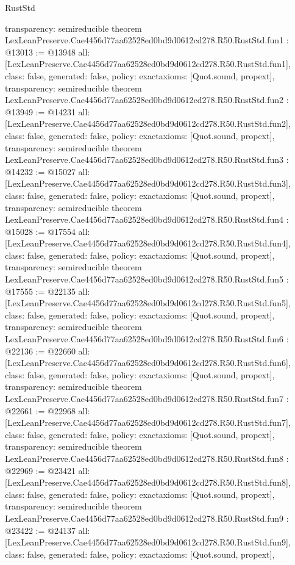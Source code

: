 \begin{lexlean}{RustStd}
\begin{coremodule}
{  transparency: semireducible
}
theorem LexLeanPreserve.Cae4456d77aa62528ed0bd9d0612cd278.R50.RustStd.fun1 : @13013 := @13948 {
  all: [LexLeanPreserve.Cae4456d77aa62528ed0bd9d0612cd278.R50.RustStd.fun1],
  class: false,
  generated: false,
  policy: exact{axioms: [Quot.sound, propext]},
  transparency: semireducible
}
theorem LexLeanPreserve.Cae4456d77aa62528ed0bd9d0612cd278.R50.RustStd.fun2 : @13949 := @14231 {
  all: [LexLeanPreserve.Cae4456d77aa62528ed0bd9d0612cd278.R50.RustStd.fun2],
  class: false,
  generated: false,
  policy: exact{axioms: [Quot.sound, propext]},
  transparency: semireducible
}
theorem LexLeanPreserve.Cae4456d77aa62528ed0bd9d0612cd278.R50.RustStd.fun3 : @14232 := @15027 {
  all: [LexLeanPreserve.Cae4456d77aa62528ed0bd9d0612cd278.R50.RustStd.fun3],
  class: false,
  generated: false,
  policy: exact{axioms: [Quot.sound, propext]},
  transparency: semireducible
}
theorem LexLeanPreserve.Cae4456d77aa62528ed0bd9d0612cd278.R50.RustStd.fun4 : @15028 := @17554 {
  all: [LexLeanPreserve.Cae4456d77aa62528ed0bd9d0612cd278.R50.RustStd.fun4],
  class: false,
  generated: false,
  policy: exact{axioms: [Quot.sound, propext]},
  transparency: semireducible
}
theorem LexLeanPreserve.Cae4456d77aa62528ed0bd9d0612cd278.R50.RustStd.fun5 : @17555 := @22135 {
  all: [LexLeanPreserve.Cae4456d77aa62528ed0bd9d0612cd278.R50.RustStd.fun5],
  class: false,
  generated: false,
  policy: exact{axioms: [Quot.sound, propext]},
  transparency: semireducible
}
theorem LexLeanPreserve.Cae4456d77aa62528ed0bd9d0612cd278.R50.RustStd.fun6 : @22136 := @22660 {
  all: [LexLeanPreserve.Cae4456d77aa62528ed0bd9d0612cd278.R50.RustStd.fun6],
  class: false,
  generated: false,
  policy: exact{axioms: [Quot.sound, propext]},
  transparency: semireducible
}
theorem LexLeanPreserve.Cae4456d77aa62528ed0bd9d0612cd278.R50.RustStd.fun7 : @22661 := @22968 {
  all: [LexLeanPreserve.Cae4456d77aa62528ed0bd9d0612cd278.R50.RustStd.fun7],
  class: false,
  generated: false,
  policy: exact{axioms: [Quot.sound, propext]},
  transparency: semireducible
}
theorem LexLeanPreserve.Cae4456d77aa62528ed0bd9d0612cd278.R50.RustStd.fun8 : @22969 := @23421 {
  all: [LexLeanPreserve.Cae4456d77aa62528ed0bd9d0612cd278.R50.RustStd.fun8],
  class: false,
  generated: false,
  policy: exact{axioms: [Quot.sound, propext]},
  transparency: semireducible
}
theorem LexLeanPreserve.Cae4456d77aa62528ed0bd9d0612cd278.R50.RustStd.fun9 : @23422 := @24137 {
  all: [LexLeanPreserve.Cae4456d77aa62528ed0bd9d0612cd278.R50.RustStd.fun9],
  class: false,
  generated: false,
  policy: exact{axioms: [Quot.sound, propext]},
}
\end{coremodule}
\end{lexlean}
